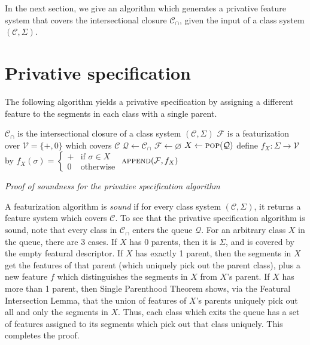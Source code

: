 \documentclass[11pt, oneside]{article}   	%
\begin{document}
In the next section, we give an algorithm which generates a privative feature system that covers the intersectional closure $\mathcal C_\cap$, given the input of a class system $(\mathcal C, \Sigma)$.

 \section{Privative specification}

The following algorithm yields a privative specification by assigning a different feature  to the segments in each class with a single parent.
 
\noindent \begin{algorithmic}
    \REQUIRE $\mathcal C_\cap$ is the intersectional closure of a class system $(\mathcal C, \Sigma)$
    \ENSURE $\mathcal F$ is a featurization over $\mathcal V = \{ +, 0 \}$ which covers $\mathcal C$
    \STATE
    \STATE $\mathcal Q \leftarrow \mathcal C_\cap$
    \STATE $\mathcal F \leftarrow \varnothing$
    \STATE
        \STATE $X \leftarrow \textsc{pop}(\mathcal Q)$
            \STATE define $f_X : \Sigma \rightarrow \mathcal V$ by $f_X(\sigma) = \begin{cases}
                + & \mbox{if } \sigma \in X \\
                0 & \mbox{otherwise}
                \end{cases} $
            \STATE $\textsc{append}(\mathcal F, f_X)$
        \ENDIF
    \ENDWHILE
\end{algorithmic}

\vspace{\baselineskip} \noindent \textit{Proof of soundness for the privative specification algorithm}

A featurization algorithm is \textit{sound} if for every class system $(\mathcal C, \Sigma)$, it returns a feature system which covers $\mathcal C$. To see that the privative specification algorithm is sound, note that every class in $\mathcal C_\cap$ enters the queue $\mathcal Q$. For an arbitrary class $X$ in the queue, there are 3 cases. If $X$ has 0 parents, then it is $\Sigma$, and is covered by the empty featural descriptor. If $X$ has exactly 1 parent, then the segments in $X$ get the features of that parent (which uniquely pick out the parent class), plus a new feature $f$ which distinguishes the segments in $X$ from $X$'s parent. If $X$ has more than 1 parent, then Single Parenthood Theorem shows, via the Featural Intersection Lemma, that the union of features of $X$'s parents uniquely pick out all and only the segments in $X$. Thus, each class which exits the queue has a set of features assigned to its segments which pick out that class uniquely. This completes the proof.
\end{document}
